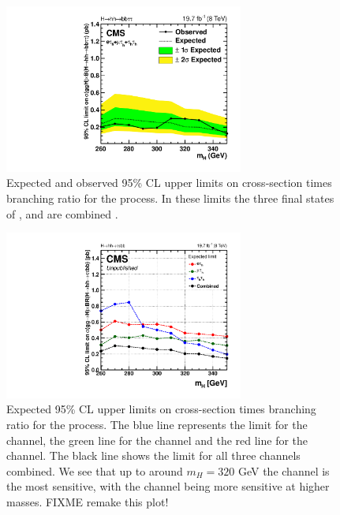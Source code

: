 \begin{figure}[h!]
\begin{center}
\includegraphics[width=0.7\textwidth]{Hhh/Plots/CMS-HIG-14-034_Figure_008-d.pdf}
\caption{Expected and observed 95\% CL upper limits on cross-section times branching ratio
for the \Htohhtobbtautau process. In these limits the three final states of \etau, \mutau and \tautau are combined \cite{CMS-HIG-14-034}.}
\label{fig:hhh_results_modelindep}
\end{center}
\end{figure}

\begin{figure}[h!]
\begin{center}
\includegraphics[width=0.7\textwidth]{Hhh/Plots/CMS-HIG-14-034_Figure-aux_033.pdf}
\caption{Expected 95\% CL upper limits on cross-section times branching ratio for the \Htohhtobbtautau process.
The blue line represents the limit for the \tautau channel, the green line for the \mutau channel and the
red line for the \etau channel. The black line shows the limit for all three channels combined. We see that up to around
$m_H = 320$ GeV the \mutau channel is the most sensitive, with the \tautau channel being more sensitive at higher masses. FIXME remake this plot!}
\label{fig:hhh_results_modelindep_perchannel}
\end{center}
\end{figure}


